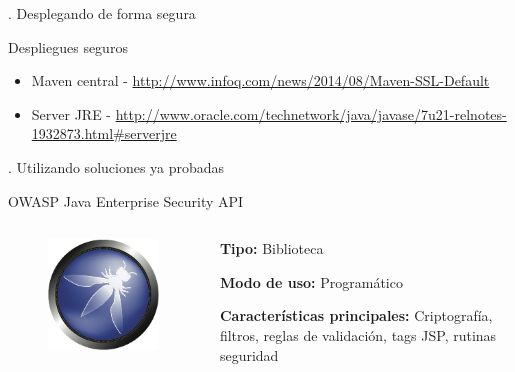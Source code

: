 \documentclass[12pt]{beamer}
\begin{document}
\begin{frame}
\LARGE {}. Desplegando de forma segura
\end{frame}

\begin{frame}{Despliegues seguros}
\begin{itemize}
\item Maven central - \url{http://www.infoq.com/news/2014/08/Maven-SSL-Default}
\item Server JRE - \url{http://www.oracle.com/technetwork/java/javase/7u21-relnotes-1932873.html\#serverjre}
\end{itemize}
\end{frame}




\begin{frame}
\LARGE {}. Utilizando soluciones ya probadas
\end{frame}

\begin{frame}{OWASP Java Enterprise Security API}
  \begin{columns}
      \begin{column}{.5\linewidth}
  	    \begin{figure}
  	    \centering
  	    \includegraphics[width=0.6\linewidth]{Images/owasp}
  	    \end{figure}
      \end{column}
    \begin{column}{.5\linewidth}
	    \textbf{Tipo:} Biblioteca
	    
	    \textbf{Modo de uso:} Programático
	    
	    \textbf{Características principales:}
	    Criptografía, filtros, reglas de validación, tags JSP, rutinas seguridad
    \end{column}

  \end{columns}
\end{frame}
\end{document}
